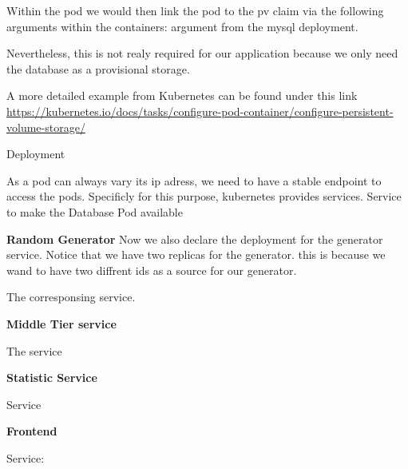 Within the pod we would then link the pod to the pv claim via the following arguments within the containers: argument from the mysql deployment.

Nevertheless, this is not realy required for our application because we only need the database as a provisional storage.

A more detailed example from Kubernetes can be found under this link \url{https://kubernetes.io/docs/tasks/configure-pod-container/configure-persistent-volume-storage/}

Deployment


As a pod can always vary its ip adress, we need to have a stable endpoint to access the pods.
Specificly for this purpose, kubernetes provides services.
Service to make the Database Pod available 


\textbf{Random Generator}
Now we also declare the deployment for the generator service.
Notice that we have two replicas for the generator. this is because we wand to have two diffrent ids as a source for our generator.


The corresponsing service.


\textbf{Middle Tier service}

The service


\textbf{Statistic Service}

Service


\textbf{Frontend}


Service:


